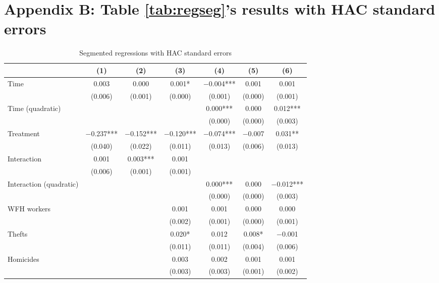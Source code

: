 \documentclass[11pt,a4paper]{article}\usepackage[]{graphicx}\usepackage[]{xcolor}
\begin{document}
\section*{Appendix B: Table \ref{tab:regseg}'s results with HAC standard errors}
\label{sec:appb}
\setcounter{table}{0} %
\renewcommand{\thetable}{B.\arabic{table}} %
\begin{table}[h]
\caption{Segmented regressions with HAC standard errors}
\label{app:seg}

\begin{tabular}[t]{lcccccc}
\toprule
  & (1) & (2) & (3) & (4) & (5) & (6)\\
\midrule
Time & \num{0.003} & \num{0.000} & \num{0.001}* & \num{-0.004}*** & \num{0.001} & \num{0.001}\\
 & (\num{0.006}) & (\num{0.001}) & (\num{0.000}) & (\num{0.001}) & (\num{0.000}) & (\num{0.001})\\
Time (quadratic) &  &  &  & \num{0.000}*** & \num{0.000} & \num{0.012}***\\
 &  &  &  & (\num{0.000}) & (\num{0.000}) & \vphantom{1} (\num{0.003})\\
Treatment & \num{-0.237}*** & \num{-0.152}*** & \num{-0.120}*** & \num{-0.074}*** & \num{-0.007} & \num{0.031}**\\
 & (\num{0.040}) & (\num{0.022}) & (\num{0.011}) & (\num{0.013}) & (\num{0.006}) & (\num{0.013})\\
Interaction & \num{0.001} & \num{0.003}*** & \num{0.001} &  &  & \\
 & (\num{0.006}) & (\num{0.001}) & (\num{0.001}) &  &  & \\
Interaction (quadratic) &  &  &  & \num{0.000}*** & \num{0.000} & \num{-0.012}***\\
 &  &  &  & (\num{0.000}) & (\num{0.000}) & (\num{0.003})\\
WFH workers &  &  & \num{0.001} & \num{0.001} & \num{0.000} & \num{0.000}\\
 &  &  & (\num{0.002}) & (\num{0.001}) & (\num{0.000}) & (\num{0.001})\\
Thefts &  &  & \num{0.020}* & \num{0.012} & \num{0.008}* & \num{-0.001}\\
 &  &  & (\num{0.011}) & (\num{0.011}) & (\num{0.004}) & (\num{0.006})\\
Homicides &  &  & \num{0.003} & \num{0.002} & \num{0.001} & \num{0.001}\\
 &  &  & (\num{0.003}) & (\num{0.003}) & (\num{0.001}) & (\num{0.002})\\

\end{tabular}
\end{table}
\end{document}

